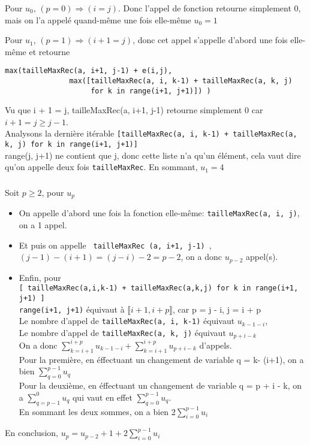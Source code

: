\documentclass[french]{article}
\begin{document}
\subsubsection{}
Pour $u_{0}$, $(p = 0) \Rightarrow (i = j)$. Donc l'appel de fonction retourne simplement 0, mais on l'a appelé quand-même une fois elle-même $u_{0}=1$ \par
Pour $u_{1}$, $(p = 1) \Rightarrow (i + 1 = j)$, donc cet appel s'appelle d'abord une fois elle-même et retourne 
\begin{lstlisting}
max(tailleMaxRec(a, i+1, j-1) + e(i,j),
               max([tailleMaxRec(a, i, k-1) + tailleMaxRec(a, k, j)
                    for k in range(i+1, j+1)]) )\end{lstlisting}
Vu que i + 1 = j,  tailleMaxRec(a, i+1, j-1) retourne simplement 0 car $i+1=j\geq j-1$.\\
Analysons la dernière itérable 
\lstinline{[tailleMaxRec(a, i, k-1) + tailleMaxRec(a, k, j) for k in range(i+1, j+1)]}\\
range(j, j+1) ne contient que j, donc cette liste n'a qu'un élément, cela vaut dire qu'on appelle deux fois  \lstinline{tailleMaxRec}.
En sommant, $u_{1} = 4$
\subsubsection{}

Soit $p \geq 2$, pour $u_{p}$\\
	\begin{itemize}
	\item
	On appelle d'abord une fois la fonction elle-même: \lstinline{tailleMaxRec(a, i, j)}, on a 1 appel. 
	\item
	Et puis on appelle  \lstinline{ tailleMaxRec (a, i+1, j-1) },\\
	 $(j-1)-(i+1)=(j-i)-2=p-2$, on a donc $u_{p-2}$ appel(s).
	\item
	Enfin, pour\\
 \lstinline{[ tailleMaxRec(a,i,k-1) + tailleMaxRec(a,k,j) for k in range(i+1, j+1) ]}\\
	\lstinline{range(i+1, j+1)} équivaut à $\llbracket i+1, i+p \rrbracket$, car p = j - i, j = i + p\\
Le nombre d'appel de \lstinline{tailleMaxRec(a, i, k-1)} équivaut $u_{k-1-i}$,\\Le nombre d'appel de \lstinline{tailleMaxRec(a, k, j)} équivaut $u_{p+i-k}$\\	
On a donc $\sum_{k=i+1}^{i+p} u_{k-1-i} + \sum_{k=i+1}^{i+p} u_{p+i-k}$ d'appels.\\
Pour la première, en éffectuant un changement de variable q = k- (i+1), on a bien $\sum_{q=0}^{p-1} u_{q}$\\
Pour la deuxième, en éffectuant un changement de variable q = p + i - k, on a  $\sum_{q=p-1}^{0} u_{q}$ qui vaut en effet $\sum_{q=0}^{p-1} u_{q}$.\\
En sommant les deux sommes, on a bien $2\sum_{i=0}^{p-1} u_{i}$
	\end{itemize}
\par
En conclusion, $u_{p}=u_{p-2}+1+2\sum_{i=0}^{p-1} u_{i}$
\end{document}
